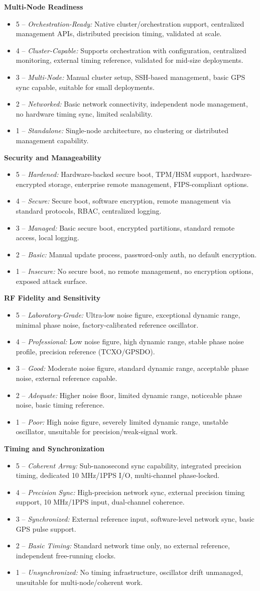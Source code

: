 \documentclass[11pt,a4paper]{article}
\newcommand{\criteriaheading}[1]{\par\smallskip\noindent\textbf{#1}\par}
\newcommand{\scoreitem}[3]{\item #1 -- \textit{#2:} #3}
\begin{document}
\criteriaheading{Multi-Node Readiness}
\begin{itemize}
  \scoreitem{5}{Orchestration-Ready}{Native cluster/orchestration support, centralized management APIs, distributed precision timing, validated at scale.}
  \scoreitem{4}{Cluster-Capable}{Supports orchestration with configuration, centralized monitoring, external timing reference, validated for mid-size deployments.}
  \scoreitem{3}{Multi-Node}{Manual cluster setup, SSH-based management, basic GPS sync capable, suitable for small deployments.}
  \scoreitem{2}{Networked}{Basic network connectivity, independent node management, no hardware timing sync, limited scalability.}
  \scoreitem{1}{Standalone}{Single-node architecture, no clustering or distributed management capability.}
\end{itemize}

\criteriaheading{Security and Manageability}
\begin{itemize}
  \scoreitem{5}{Hardened}{Hardware-backed secure boot, TPM/HSM support, hardware-encrypted storage, enterprise remote management, FIPS-compliant options.}
  \scoreitem{4}{Secure}{Secure boot, software encryption, remote management via standard protocols, RBAC, centralized logging.}
  \scoreitem{3}{Managed}{Basic secure boot, encrypted partitions, standard remote access, local logging.}
  \scoreitem{2}{Basic}{Manual update process, password-only auth, no default encryption.}
  \scoreitem{1}{Insecure}{No secure boot, no remote management, no encryption options, exposed attack surface.}
\end{itemize}

\criteriaheading{RF Fidelity and Sensitivity}
\begin{itemize}
  \scoreitem{5}{Laboratory-Grade}{Ultra-low noise figure, exceptional dynamic range, minimal phase noise, factory-calibrated reference oscillator.}
  \scoreitem{4}{Professional}{Low noise figure, high dynamic range, stable phase noise profile, precision reference (TCXO/GPSDO).}
  \scoreitem{3}{Good}{Moderate noise figure, standard dynamic range, acceptable phase noise, external reference capable.}
  \scoreitem{2}{Adequate}{Higher noise floor, limited dynamic range, noticeable phase noise, basic timing reference.}
  \scoreitem{1}{Poor}{High noise figure, severely limited dynamic range, unstable oscillator, unsuitable for precision/weak-signal work.}
\end{itemize}

\criteriaheading{Timing and Synchronization}
\begin{itemize}
  \scoreitem{5}{Coherent Array}{Sub-nanosecond sync capability, integrated precision timing, dedicated 10 MHz/1PPS I/O, multi-channel phase-locked.}
  \scoreitem{4}{Precision Sync}{High-precision network sync, external precision timing support, 10 MHz/1PPS input, dual-channel coherence.}
  \scoreitem{3}{Synchronized}{External reference input, software-level network sync, basic GPS pulse support.}
  \scoreitem{2}{Basic Timing}{Standard network time only, no external reference, independent free-running clocks.}
  \scoreitem{1}{Unsynchronized}{No timing infrastructure, oscillator drift unmanaged, unsuitable for multi-node/coherent work.}
\end{itemize}
\end{document}
